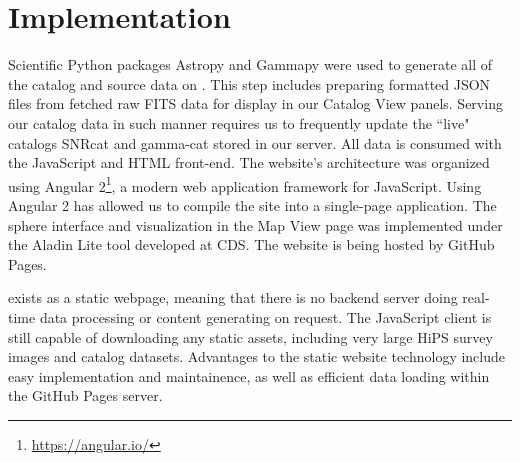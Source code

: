 \section{Implementation}

Scientific Python packages Astropy \cite{astropy} and Gammapy were used to generate all of the catalog and source data on \gammasky. This step includes preparing formatted JSON files from fetched raw FITS data for display in our Catalog View panels. Serving our catalog data in such manner requires us to frequently update the ``live" catalogs SNRcat and gamma-cat stored in our server. All data is consumed with the JavaScript and HTML front-end. The website's architecture was organized using Angular 2\footnote[5]{\url{https://angular.io/}}, a modern web application framework for JavaScript. Using Angular 2 has allowed us to compile the site into a single-page application. The sphere interface and visualization in the Map View page was implemented under the Aladin Lite tool \cite{aladin-lite} developed at CDS. The website is being hosted by GitHub Pages.


\gammasky exists as a static webpage, meaning that there is no backend server doing real-time data processing or content generating on request. The JavaScript client is still capable of downloading any static assets, including very large HiPS survey images and catalog datasets. Advantages to the static website technology include easy implementation and maintainence, as well as efficient data loading within the GitHub Pages server.

